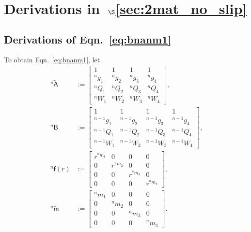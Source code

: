 \documentclass[preprint,10pt,times]{elsarticle}
\numberwithin{equation}{section}
\renewcommand{\u}[1]{\boldsymbol{#1}}
\newcommand{\usf}[1]{\u{\mathsf #1}}
\renewcommand{\>}{$\Rightarrow$}
\begin{document}
\section{Derivations in~$\S$\ref{sec:2mat_no_slip}}
\label{Appen:derivations}
\subsection{Derivations of Eqn.~\eqref{eq:bnanm1}}
\label{Appen:Eqn315}
To obtain Eqn.~\eqref{eq:bnanm1}, let
\begin{subequations}
\begin{align}
	~^{n}\tilde{\usf{A}}
	& :=
	\begin{bmatrix}
		1 & 1 & 1 & 1 \\
		{}^{n}\!{g_{1}} & {}^{n}\!{g_{2}} & {}^{n}\!{g_{3}} & {}^{n}\!{g_{4}} \\
		{}^{n}\!{Q_{1}} & {}^{n}\!{Q_{2}} & {}^{n}\!{Q_{3}} & {}^{n}\!{Q_{4}} \\
		{}^{n}\!{W_{1}} & {}^{n}\!{W_{2}} & {}^{n}\!{W_{3}} & {}^{n}\!{W_{4}}
	\end{bmatrix}, \\
	~^{n}\tilde{\usf{B}}
	& :=
	\begin{bmatrix}
		1 & 1 & 1 & 1 \\
		{}^{n-1}\!{g_{1}} & {}^{n-1}\!{g_{2}} & {}^{n-1}\!{g_{3}} & {}^{n-1}\!{g_{4}} \\
		{}^{n-1}\!{Q_{1}} & {}^{n-1}\!{Q_{2}} & {}^{n-1}\!{Q_{3}} & {}^{n-1}\!{Q_{4}} \\
		{}^{n-1}\!{W_{1}} & {}^{n-1}\!{W_{2}} & {}^{n-1}\!{W_{3}} & {}^{n-1}\!{W_{4}}
	\end{bmatrix}, \\
	~^{n}\usf{f}(r)
	& :=
	\begin{bmatrix}
		{r}^{{}^{n}\!{m_{1}}} & 0 & 0 & 0 \\
		0 & {r}^{{}^{n}\!{m_{2}}} & 0 & 0 \\
		0 & 0 & {r}^{{}^{n}\!{m_{3}}} & 0 \\
		0 & 0 & 0 & {r}^{{}^{n}\!{m_{4}}}
	\end{bmatrix}, \\
	~^{n}\tilde{\usf{m}}
	& :=
	\begin{bmatrix}
		{}^{n}\!{m_{1}} & 0 & 0 & 0 \\
		0 & {}^{n}\!{m_{2}} & 0 & 0 \\
		0 & 0 & {}^{n}\!{m_{3}} & 0 \\
		0 & 0 & 0 & {}^{n}\!{m_{4}}
	\end{bmatrix}.
	\end{align}
	\label{eq:C1}
\end{subequations}
\end{document}
